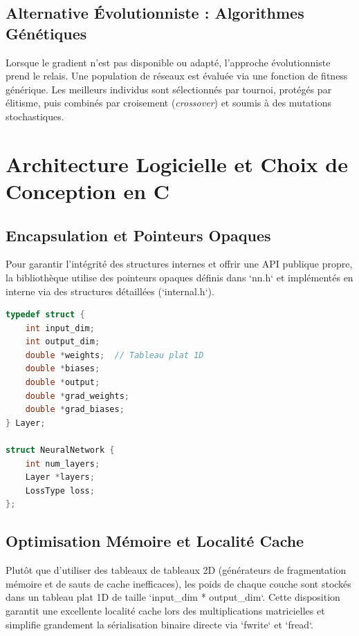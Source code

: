 \documentclass[11pt,a4paper]{article}
\begin{document}
\subsection{Alternative Évolutionniste : Algorithmes Génétiques}
Lorsque le gradient n'est pas disponible ou adapté, l'approche évolutionniste prend le relais. Une population de réseaux est évaluée via une fonction de fitness générique. Les meilleurs individus sont sélectionnés par tournoi, protégés par élitisme, puis combinés par croisement (\textit{crossover}) et soumis à des mutations stochastiques.

\section{Architecture Logicielle et Choix de Conception en C}

\subsection{Encapsulation et Pointeurs Opaques}
Pour garantir l'intégrité des structures internes et offrir une API publique propre, la bibliothèque utilise des pointeurs opaques définis dans `nn.h` et implémentés en interne via des structures détaillées (`internal.h`).

\begin{lstlisting}[language=C, caption={Structure interne d'une couche et d'un réseau}]
typedef struct {
    int input_dim;
    int output_dim;
    double *weights;  // Tableau plat 1D
    double *biases;
    double *output;
    double *grad_weights;
    double *grad_biases;
} Layer;

struct NeuralNetwork {
    int num_layers;
    Layer *layers;
    LossType loss;
};
\end{lstlisting}

\subsection{Optimisation Mémoire et Localité Cache}
Plutôt que d'utiliser des tableaux de tableaux 2D (générateurs de fragmentation mémoire et de sauts de cache inefficaces), les poids de chaque couche sont stockés dans un tableau plat 1D de taille `input\_dim * output\_dim`. Cette disposition garantit une excellente localité cache lors des multiplications matricielles et simplifie grandement la sérialisation binaire directe via `fwrite` et `fread`.
\end{document}
